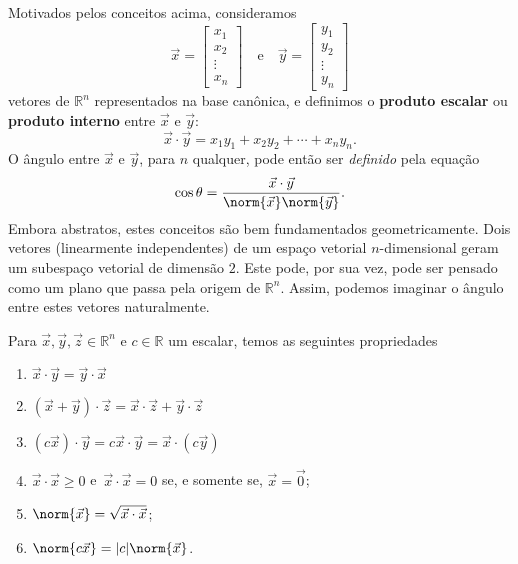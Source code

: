 Motivados pelos conceitos acima, consideramos
\begin{equation}
\vec{x} =
\begin{bmatrix}
x_1 \\ x_2 \\ \vdots \\ x_n
\end{bmatrix} \quad \text{e} \quad \vec{y} =
\begin{bmatrix}
y_1 \\ y_2 \\ \vdots \\ y_n
\end{bmatrix}
\end{equation} vetores de $\mathbb{R}^n$ representados na base canônica, e definimos o \textbf{produto escalar} ou \textbf{produto interno} entre $\vec{x}$ e $\vec{y}$:
\begin{equation}
\vec{x} \cdot \vec{y} = x_1 y_1 + x_2 y_2 + \cdots + x_n y_n.
\end{equation} O ângulo entre $\vec{x}$ e $\vec{y}$, para $n$ qualquer, pode então ser \textit{definido} pela equação
\begin{equation}
\cos \theta = \frac{\vec{x} \cdot \vec{y}}{\norm{\vec{x}} \norm{\vec{y}}}.
\end{equation} Embora abstratos, estes conceitos são bem fundamentados geometricamente. Dois vetores (linearmente independentes) de um espaço vetorial $n$-dimensional geram um subespaço vetorial de dimensão $2$. Este pode, por sua vez, pode ser pensado como um plano que passa pela origem de $\mathbb{R}^n$. Assim, podemos imaginar o ângulo entre estes vetores naturalmente.

\begin{prop}
	Para $\vec{x}, \vec{y}, \vec{z} \in \mathbb{R}^n$ e $c \in \mathbb{R}$ um escalar, temos as seguintes propriedades
	\begin{enumerate}
		\item  $\vec{x} \cdot \vec{y} = \vec{y} \cdot \vec{x}$
		\item  $(\vec{x} + \vec{y}) \cdot \vec{z} = \vec{x} \cdot \vec{z} + \vec{y} \cdot \vec{z}$
		\item  $(c\vec{x}) \cdot \vec{y} = c \vec{x} \cdot \vec{y} = \vec{x} \cdot (c\vec{y})$
		\item  $\vec{x} \cdot \vec{x} \ge 0$ e $\, \vec{x} \cdot \vec{x} = 0$ se, e somente se, $\vec{x} = \vec{0}$;
		\item  $\norm{\vec{x}} = \sqrt{\vec{x} \cdot \vec{x}}$;
		\item  $\norm{c \vec{x} } =  |c| \norm{\vec{x}}$.
	\end{enumerate}
\end{prop}

